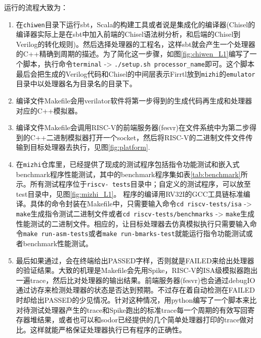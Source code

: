 运行的流程大致为：
\begin{enumerate}[label=(\alph*)]
	\item 在\texttt{chiwen}目录下运行sbt，Scala的构建工具或者说是集成化的编译器(Chisel的编译器实际上是在sbt中加入前端的Chisel语法树分析，和后端的Chisel到Verilog的转化规则)。然后选择处理器的工程名，这样sbt就会产生一个处理器的C++精确到周期的描述。为了简化这一步骤，如图\ref{fig:chiwen_L1}编写了一个脚本，执行命令{\footnotesize \verb|terminal| -> \verb|./setup.sh processor_name|}即可。这个脚本最后会把生成的Verilog代码和Chisel的中间层表示Firrtl放到\texttt{mizhi}的\texttt{emulator}目录中以处理器名为目录名的目录下。
	\item 编译文件Makefile会用verilator软件将第一步得到的生成代码再生成和处理器对应的C++模拟器。
	\item 编译文件Makefile会调用RISC-V的前端服务器(fesvr)在文件系统中为第二步得到的C++二进制模拟器打开一个socket，然后将RISC-V的二进制文件文件传输到目标处理器去执行，见图\ref{fig:platform}.
	\item 在\texttt{mizhi}仓库里，已经提供了现成的测试程序包括指令功能测试和嵌入式benchmark程序性能测试，其中的benchmark程序集如表\ref{tab:benchmark}所示。所有测试程序位于\texttt{riscv- tests}目录中；自定义的测试程序，可以放至test目录中，见图\ref{fig:mizhi_L1}。 程序的编译用RV32I的GCC工具链标准编译。具体的命令封装在Makefile中，只需要输入命令{\footnotesize \verb|cd riscv-tests/isa| -> \verb|make|}生成指令测试二进制文件或者{\footnotesize \verb|cd riscv-tests/benchmarks| -> \verb|make|}生成性能测试的二进制文件。相应的，让目标处理器去仿真模拟执行只需要输入命令{\footnotesize \verb|make run-asm-tests|}或者{\footnotesize \verb|make run-bmarks-test|}就能运行指令功能测试或者benchmark性能测试。
	\item 最后如果通过，会在终端给出PASSED字样，否则就是FAILED来给出处理器的验证结果。大致的机理是Makefile会先用Spike，RISC-V的ISA级模拟器跑出一遍trace，然后比对处理器的输出结果。前端服务器(fesvr)也会通过debugIO通过访存来检测处理器的状态是否达到预期。不过存在着自动检测在FAILED时却给出PASSED的少见情况。针对这种情况，用python编写了一个脚本来比对待测试处理器产生的trace和Spike跑出的标准trace每一个周期的有效写回寄存器堆结果，或者也可以和sodor已经提供的几个简单处理器打印的trace做对比。这样就能严格保证处理器执行已有程序的正确性。
\end{enumerate}

